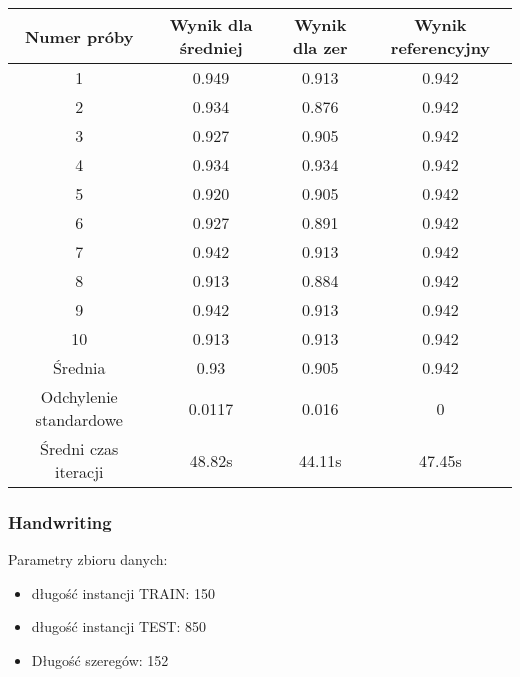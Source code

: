 \documentclass[12pt]{article}
\begin{document}
\begin{center}
\begin{tabular}{|c c c c|} 
 \hline
 Numer próby & Wynik dla średniej & Wynik dla zer & Wynik referencyjny \\ [0.5ex] 
 \hline
 1 & 0.949 & 0.913 & 0.942 \\ 
 \hline
 2 & 0.934 & 0.876 & 0.942 \\
 \hline
 3 & 0.927 & 0.905 & 0.942 \\
 \hline
 4 & 0.934 & 0.934 & 0.942 \\
 \hline
  5 & 0.920 & 0.905 & 0.942 \\
 \hline
  6 & 0.927 & 0.891 & 0.942 \\
 \hline
  7 & 0.942 & 0.913 & 0.942 \\
 \hline
  8 & 0.913 & 0.884 & 0.942 \\
 \hline
  9 & 0.942 & 0.913 & 0.942 \\
 \hline
  10 & 0.913 & 0.913 & 0.942 \\
 \hline
 Średnia & 0.93 & 0.905 & 0.942 \\
 \hline
 Odchylenie standardowe & 0.0117 & 0.016 & 0 \\  
 \hline
 Średni czas iteracji & 48.82s & 44.11s & 47.45s \\
 \hline
\end{tabular}
\end{center}

\subsubsection*{Handwriting}
Parametry zbioru danych:
\begin{itemize}
  \item długość instancji TRAIN: 150
  \item długość instancji TEST: 850
  \item Długość szeregów: 152
\end{itemize}
\end{document}

